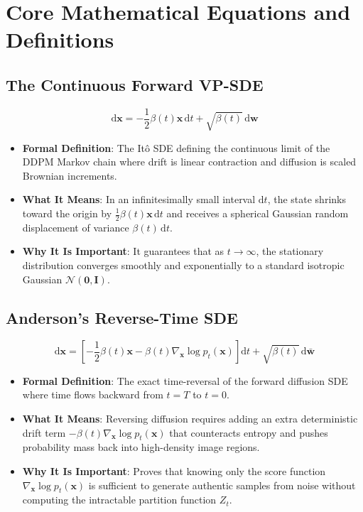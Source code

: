 \documentclass[11pt,a4paper]{article}
\theoremstyle{definition}
\begin{document}
\section{Core Mathematical Equations and Definitions}

\subsection{The Continuous Forward VP-SDE}
{\boldmath
\begin{equation}
\mathrm{d}\mathbf{x} = -\frac{1}{2}\beta(t)\mathbf{x}\,\mathrm{d}t + \sqrt{\beta(t)}\,\mathrm{d}\mathbf{w}
\end{equation}
}
\begin{itemize}
    \item \textbf{Formal Definition}: The It\^o SDE defining the continuous limit of the DDPM Markov chain where drift is linear contraction and diffusion is scaled Brownian increments.
    \item \textbf{What It Means}: In an infinitesimally small interval $\mathrm{d}t$, the state shrinks toward the origin by $\frac{1}{2}\beta(t)\mathbf{x}\,\mathrm{d}t$ and receives a spherical Gaussian random displacement of variance $\beta(t)\,\mathrm{d}t$.
    \item \textbf{Why It Is Important}: It guarantees that as $t \to \infty$, the stationary distribution converges smoothly and exponentially to a standard isotropic Gaussian $\mathcal{N}(\mathbf{0}, \mathbf{I})$.
\end{itemize}

\subsection{Anderson's Reverse-Time SDE}
{\boldmath
\begin{equation}
\mathrm{d}\mathbf{x} = \left[ -\frac{1}{2}\beta(t)\mathbf{x} - \beta(t) \nabla_\mathbf{x} \log p_t(\mathbf{x}) \right]\mathrm{d}t + \sqrt{\beta(t)}\,\mathrm{d}\bar{\mathbf{w}}
\end{equation}
}
\begin{itemize}
    \item \textbf{Formal Definition}: The exact time-reversal of the forward diffusion SDE where time flows backward from $t = T$ to $t = 0$.
    \item \textbf{What It Means}: Reversing diffusion requires adding an extra deterministic drift term $-\beta(t)\nabla_\mathbf{x}\log p_t(\mathbf{x})$ that counteracts entropy and pushes probability mass back into high-density image regions.
    \item \textbf{Why It Is Important}: Proves that knowing only the score function $\nabla_\mathbf{x} \log p_t(\mathbf{x})$ is sufficient to generate authentic samples from noise without computing the intractable partition function $Z_t$.
\end{itemize}
\end{document}
